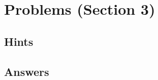 

\pagestyle{fancy}%
\fancyhead[L]{\textsc{\rightmark}}%
\fancyhead[C]{}%
\fancyhead[R]{\thepage}
\fancyfoot{}%
\renewcommand{\contentsname}{Contents}%


\tableofcontents
\clearpage
\setcounter{section}{2}
\section{Problems (Section 3)}
\subsection{Hints}


\subsection{Answers}




